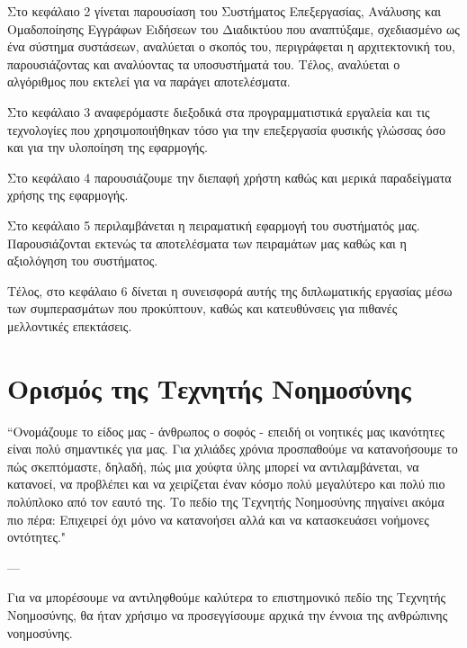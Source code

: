 \par Στο κεφάλαιο 2 γίνεται παρουσίαση του Συστήματος Επεξεργασίας, Ανάλυσης και Ομαδοποίησης Εγγράφων Ειδήσεων του Διαδικτύου 
που αναπτύξαμε, σχεδιασμένο ως ένα σύστημα συστάσεων, 
αναλύεται ο σκοπός του, περιγράφεται η αρχιτεκτονική του, παρουσιάζοντας και αναλύοντας τα υποσυστήματά του. 
Τέλος, αναλύεται ο αλγόριθμος που εκτελεί για να παράγει αποτελέσματα. \\

\par Στο κεφάλαιο 3 αναφερόμαστε διεξοδικά στα προγραμματιστικά εργαλεία και τις τεχνολογίες που χρησιμοποιήθηκαν 
τόσο για την επεξεργασία φυσικής γλώσσας όσο και για την υλοποίηση της εφαρμογής. \\

\par Στο κεφάλαιο 4 παρουσιάζουμε την διεπαφή χρήστη καθώς και μερικά παραδείγματα χρήσης της εφαρμογής. \\

\par Στο κεφάλαιο 5 περιλαμβάνεται η πειραματική εφαρμογή του συστήματός μας. 
Παρουσιάζονται εκτενώς τα αποτελέσματα των πειραμάτων μας καθώς και η αξιολόγηση του συστήματος. \\

\par Τέλος, στο κεφάλαιο 6 δίνεται η συνεισφορά αυτής της διπλωματικής εργασίας 
μέσω των συμπερασμάτων που προκύπτουν, καθώς και κατευθύνσεις για πιθανές μελλοντικές επεκτάσεις.

\section{Ορισμός της Τεχνητής Νοημοσύνης}

\epigraph{{``Ονομάζουμε το είδος μας {} - άνθρωπος ο σοφός - επειδή οι νοητικές μας ικανότητες
είναι πολύ σημαντικές για μας. Για χιλιάδες χρόνια προσπαθούμε να κατανοήσουμε το πώς σκεπτόμαστε, 
δηλαδή, πώς μια χούφτα ύλης μπορεί να αντιλαμβάνεται, να κατανοεί, να προβλέπει και να χειρίζεται 
έναν κόσμο πολύ μεγαλύτερο και πολύ πιο πολύπλοκο από τον εαυτό της. Το πεδίο της Τεχνητής Νοημοσύνης 
πηγαίνει ακόμα πιο πέρα: Επιχειρεί όχι μόνο να κατανοήσει αλλά και να κατασκευάσει νοήμονες οντότητες."}}
{--- {} \cite{Stu05}} 

Για  να  μπορέσουμε  να  αντιληφθούμε  καλύτερα  το  επιστημονικό  πεδίο  της Τεχνητής Νοημοσύνης, 
θα ήταν χρήσιμο να προσεγγίσουμε αρχικά την έννοια της ανθρώπινης νοημοσύνης. \\

